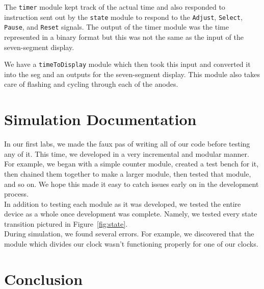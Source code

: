 \documentclass[]{article}
\begin{document}
The \texttt{timer} module kept track of the actual time and also responded to instruction sent out by the \texttt{state} module to respond to the \texttt{Adjust}, \texttt{Select}, \texttt{Pause}, and \texttt{Reset} signals. The output of the timer module was the time represented in a binary format but this was not the same as the input of the seven-segment display.

We have a \texttt{timeToDisplay} module which then took this input and converted it into the seg and an outputs for the seven-segment display. This module also takes care of flashing and cycling through each of the anodes.

\section{Simulation Documentation}

In our first labs, we made the faux pas of writing all of our code before testing any of it. This time, we developed in a very incremental and modular manner. For example, we began with a simple counter module, created a test bench for it, then chained them together to make a larger module, then tested that module, and so on. We hope this made it easy to catch issues early on in the development process.\\

In addition to testing each module as it was developed, we tested the entire device as a whole once development was complete. Namely, we tested every state transition pictured in Figure~\ref{fig:state}.\\

During simulation, we found several errors. For example, we discovered that the module which divides our clock wasn't functioning properly for one of our clocks.

\section{Conclusion}
\end{document}
